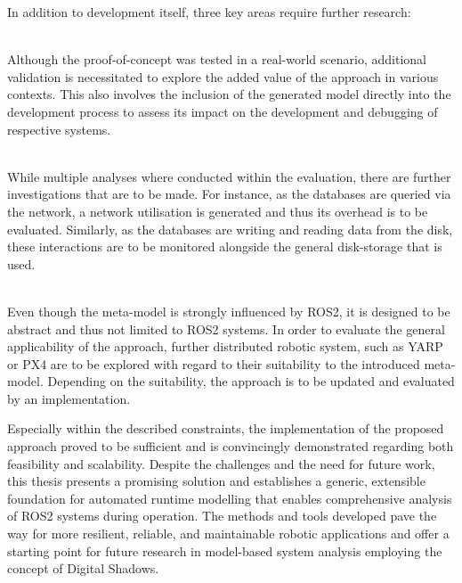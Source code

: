 In addition to development itself, three key areas require further research:
\begin{description}[leftmargin=.5cm]
    \item[Evaluate in Development Process] \hfill \\
        Although the proof-of-concept was tested in a real-world scenario, additional validation is necessitated to explore the added value of the approach in various contexts. This also involves the inclusion of the generated model directly into the development process to assess its impact on the development and debugging of respective systems.
    \item[Evaluate further Situations and Metrics] \hfill \\
        While multiple analyses where conducted within the evaluation, there are further investigations that are to be made. For instance, as the databases are queried via the network, a network utilisation is generated and thus its overhead is to be evaluated. Similarly, as the databases are writing and reading data from the disk, these interactions are to be monitored alongside the general disk-storage that is used.
    \item[Applicability to Further Robotic Systems] \hfill \\
        Even though the meta-model is strongly influenced by ROS2, it is designed to be abstract and thus not limited to ROS2 systems. In order to evaluate the general applicability of the approach, further distributed robotic system, such as YARP \cite{website:yarp} or PX4 \cite{website:px4} are to be explored with regard to their suitability to the introduced meta-model. Depending on the suitability, the approach is to be updated and evaluated by an implementation.
\end{description}

Especially within the described constraints, the implementation of the proposed approach proved to be sufficient and is convincingly demonstrated regarding both feasibility and scalability. Despite the challenges and the need for future work, this thesis presents a promising solution and establishes a generic, extensible foundation for automated runtime modelling that enables comprehensive analysis of ROS2 systems during operation. The methods and tools developed pave the way for more resilient, reliable, and maintainable robotic applications and offer a starting point for future research in model-based system analysis employing the concept of Digital Shadows.